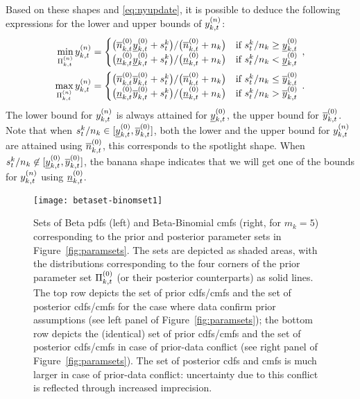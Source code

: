 \documentclass[12pt, a4paper]{elsarticle}
\begin{document}
Based on these shapes and \eqref{eq:nyupdate}, it is possible to deduce the following expressions
for the lower and upper bounds of $y^{(n)}_{k,t}$:
\begin{align}
\begin{aligned}
\min_{\Pi^{(n)}_{k,t}} y^{(n)}_{k,t} &=
 \begin{cases}
 \big(\overline{n}^{(0)}_{k,t} \underline{y}^{(0)}_{k,t} + s^k_t\big) / \big(\overline{n}^{(0)}_{k,t} + n_k\big) & \text{if } s^k_t/n_k \ge \underline{y}^{(0)}_{k,t} \\
 \big(\underline{n}^{(0)}_{k,t} \underline{y}^{(0)}_{k,t} + s^k_t\big) / \big(\underline{n}^{(0)}_{k,t} + n_k\big) & \text{if } s^k_t/n_k <   \underline{y}^{(0)}_{k,t}
 \end{cases}\,,\\
\max_{\Pi^{(n)}_{k,t}} y^{(n)}_{k,t} &=
 \begin{cases}
 \big(\overline{n}^{(0)}_{k,t} \overline{y}^{(0)}_{k,t} + s^k_t\big) / \big(\overline{n}^{(0)}_{k,t} + n_k\big) & \text{if } s^k_t/n_k \le \overline{y}^{(0)}_{k,t} \\
 \big(\underline{n}^{(0)}_{k,t} \overline{y}^{(0)}_{k,t} + s^k_t\big) / \big(\underline{n}^{(0)}_{k,t} + n_k\big) & \text{if } s^k_t/n_k >   \overline{y}^{(0)}_{k,t}
 \end{cases}\,.
\end{aligned}
\label{eq:ysetupdate}
\end{align}
The lower bound for $y^{(n)}_{k,t}$ is always attained for $\underline{y}^{(0)}_{k,t}$, the upper bound for $\overline{y}^{(0)}_{k,t}$.
Note that when $s^k_t/n_k \in [\underline{y}^{(0)}_{k,t}, \overline{y}^{(0)}_{k,t}]$,
both the lower and the upper bound for $y^{(n)}_{k,t}$ are attained using $\overline{n}^{(0)}_{k,t}$,
this corresponds to the spotlight shape.
When $s^k_t/n_k \not\in [\underline{y}^{(0)}_{k,t}, \overline{y}^{(0)}_{k,t}]$,
the banana shape indicates that
we will get one of the bounds for $y^{(n)}_{k,t}$ using $\underline{n}^{(0)}_{k,t}$.

\begin{figure}
\texttt{[image: betaset-binomset1]}
\caption{Sets of Beta pdfs (left) and Beta-Binomial cmfs (right, for $m_k=5$)
corresponding to the prior and posterior parameter sets in Figure~\ref{fig:paramsets}.
The sets are depicted as shaded areas,
with the distributions corresponding to the four corners
of the prior parameter set $\Pi^{(0)}_{k,t}$ (or their posterior counterparts) as solid lines.
The top row depicts the set of prior cdfs/cmfs and the set of posterior cdfs/cmfs for the case where data confirm prior assumptions
(see left panel of Figure~\ref{fig:paramsets});
the bottom row depicts the (identical) set of prior cdfs/cmfs and the set of posterior cdfs/cmfs in case of prior-data conflict
(see right panel of Figure~\ref{fig:paramsets}).
The set of posterior cdfs and cmfs
is much larger in case of prior-data conflict:
uncertainty due to this conflict is reflected through increased imprecision.}
\label{fig:betaset-binomset}
\end{figure}
\end{document}
